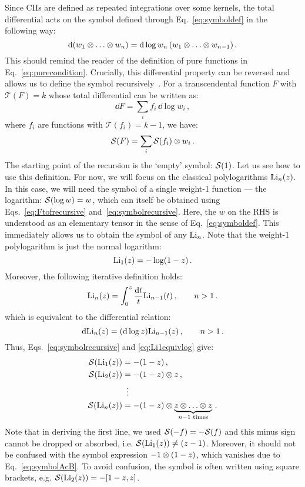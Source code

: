 \documentclass[main.tex]{subfiles}
\begin{document}
Since CIIs are defined as repeated integrations over some kernels, the total differential acts on the symbol defined through Eq.~\ref{eq:symboldef} in the following way:
\begin{equation} \label{eq:symboldiff}
    \mathrm{d} (w_1 \otimes \ldots \otimes w_n) = \mathrm{d} \log w_n \, (w_1 \otimes \ldots \otimes w_{n-1})\,.
\end{equation}
This should remind the reader of the definition of pure functions in Eq.~\ref{eq:purecondition}. Crucially, this differential property can be reversed and allows us to define the symbol recursively~\cite{Goncharov:2010jf}. For a transcendental function $F$ with $\mathcal{T}(F) = k$ whose total differential can be written as:
\begin{equation} \label{eq:Ftofrecursive}
    \dd F = \sum_i f_i \, \dd \log w_i\,,
\end{equation}
where $f_i$ are functions with $\mathcal{T}(f_i)=k-1$, we have:
\begin{equation} \label{eq:symbolrecursive}
    \mathcal{S}(F) = \sum_i \mathcal{S}(f_i)\otimes w_i \,.
\end{equation}
The starting point of the recursion is the `empty' symbol: $\mathcal{S}(1)$. Let us see how to use this definition. For now, we will focus on the classical polylogarithms $\text{Li}_n(z)$. In this case, we will need the symbol of a single weight-1 function --- the logarithm: $\mathcal{S}(\log w) = w$, which can itself be obtained using Eqs.~\ref{eq:Ftofrecursive} and~\ref{eq:symbolrecursive}. Here, the $w$ on the RHS is understood as an elementary tensor in the sense of Eq.~\ref{eq:symboldef}. This immediately allows us to obtain the symbol of any $\text{Li}_n$. Note that the weight-1 polylogarithm is just the normal logarithm:
\begin{equation} \label{eq:Li1equivlog}
    \text{Li}_1(z) = -\log (1-z)\,. 
\end{equation}
Moreover, the following iterative definition holds:
\begin{equation} \label{eq:Liiterative}
    \text{Li}_n(z) = \int_0^z \frac{\mathrm{d} t}{t} \text{Li}_{n-1}(t)\,, \qquad n>1\,.
\end{equation}
which is equivalent to the differential relation:
\begin{equation}
    \mathrm{d} \text{Li}_n(z) = (\mathrm{d} \log z) \text{Li}_{n-1}(z)\,, \qquad n>1\,.
\end{equation}
Thus, Eqs.~\ref{eq:symbolrecursive} and \ref{eq:Li1equivlog} give:
\begin{align} \label{eq:Lisymbols}
    \mathcal{S}(\text{Li}_1(z)) &= -(1-z)\,, \nonumber \\
    \mathcal{S}(\text{Li}_2(z)) &= -(1-z) \otimes z \,, \nonumber \\
    &\,\,\, \vdots \nonumber \\
    \mathcal{S}(\text{Li}_n(z)) &= -(1-z) \otimes \underbrace{z \otimes \ldots \otimes z}_{n-1 \text{ times}}\,.
\end{align}
Note that in deriving the first line, we used $\mathcal{S}(-f) = -\mathcal{S}(f)$ and this minus sign cannot be dropped or absorbed, i.e. $\mathcal{S}(\text{Li}_1(z)) \neq (z-1)$. Moreover, it should not be confused with the symbol expression $-1 \otimes (1-z)$, which vanishes due to Eq.~\ref{eq:symbolAcB}. To avoid confusion, the symbol is often written using square brackets, e.g. $\mathcal{S}(\text{Li}_2(z)) = -[1-z, z]$.
\end{document}
